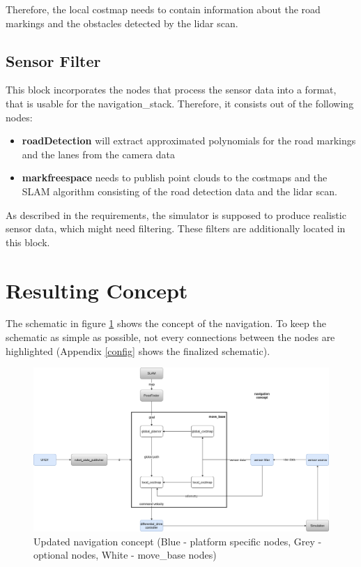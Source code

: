 Therefore, the local costmap needs to contain information about the road markings and the obstacles detected by the lidar scan.


\subsection{Sensor Filter}

This block incorporates the nodes that process the sensor data into a format, that is usable for the navigation\_stack. 
Therefore, it consists out of the following nodes:

\begin{itemize}
	\item \textbf{roadDetection} will extract approximated polynomials for the road markings and the lanes from the camera data
	\item \textbf{markfreespace} needs to publish point clouds to the costmaps and the SLAM algorithm consisting of the road detection data and the lidar scan.
\end{itemize}

As described in the requirements, the simulator is supposed to produce realistic sensor data, which might need filtering. These filters are additionally located in this block.

\section{Resulting Concept}
The schematic in figure \ref{navconcept} shows the concept of the navigation.  To keep the schematic as simple as possible, not every connections between the nodes are highlighted (Appendix \ref{config} shows the finalized schematic).\\

\begin{figure} 
	\begin{center}
		\includegraphics[width=140mm]{Pictures/Updated navigation concept}
		\caption[Updated navigation concept]{Updated navigation concept (Blue - platform specific nodes, Grey - optional nodes, White - move\_base nodes)}
		\label{navconcept}
	\end{center}
\end{figure}




